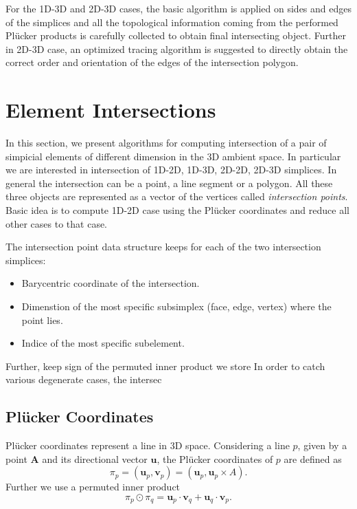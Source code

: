 \documentclass{elsarticle}
\newcommand{\figpath}{figures/}
\def\vc#1{\mathbf{\boldsymbol{#1}}}     %
\newcommand{\plucker}{Pl\"{u}cker }
\begin{document}
\begin{figure}[!htb]
  \centering
  \setcounter{subfigure}{0}
  \hspace{10pt}
\end{figure}
      
For the 1D-3D and 2D-3D cases, the basic algorithm is applied on sides and edges of the simplices and 
all the topological information coming from the performed \plucker products is carefully collected
to obtain final intersecting object.
Further in 2D-3D case, an optimized tracing algorithm is suggested to directly obtain the correct order and 
orientation of the edges of the intersection polygon.


\section{Element Intersections}
\label{sec:elements_intersections}
In this section, we present algorithms for computing intersection of a pair of simpicial elements of different dimension in the 3D ambient space.
In particular we are interested in intersection of 1D-2D, 1D-3D, 2D-2D, 2D-3D simplices. In general the intersection can be a point, a line segment or a polygon.
All these three objects are represented as a vector of the vertices called \emph{intersection points}. Basic idea is to compute 1D-2D case using the 
\plucker coordinates and reduce all other cases to that case. 

The intersection point data structure keeps for each of the two intersection simplices:
\begin{itemize}
 \item Barycentric coordinate of the intersection.
 \item Dimenstion of the most specific subsimplex (face, edge, vertex) where the point lies.
 \item Indice of the most specific subelement.
\end{itemize}
Further, keep sign of the permuted inner product  we store
In order to catch various degenerate cases, the intersec



\subsection{\plucker Coordinates}
\plucker coordinates represent a line in 3D space.
Considering a line $p$, given by a point $\vc A$ and its directional vector $\vc{u}$, 
the \plucker coordinates of $p$ are defined as
\[ \pi_p = (\vc{u}_p, \vc{v}_p) = (\vc{u}_p, \vc{u}_p\times A). \]
Further we use a permuted inner product
\[\pi_p \odot \pi_q = \vc{u}_p\cdot \vc{v}_q + \vc{u}_q \cdot \vc{v}_p. \]
\end{document}
